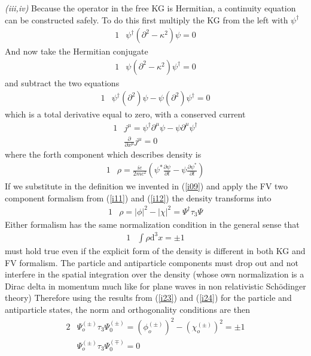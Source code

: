 \documentclass[]{article}
\numberwithin{equation}{subsection}
\begin{document}
\noindent\emph{(iii,iv)} Because the operator in the free KG is Hermitian, a continuity equation can be constructed safely. To do this first multiply the KG from the left with $\psi^{\dagger}$
\begin{alignat}{1}
  \label{ii01} &\psi^{\dagger}(\partial^{2}-\kappa^{2})\psi=0
\end{alignat}
And now take the Hermitian conjugate
\begin{alignat}{1}
  \label{ii02} &\psi(\partial^{2}-\kappa^{2})\psi^{\dagger}=0
\end{alignat}
and subtract the two equations
\begin{alignat}{1}
  \label{ii03} &\psi^{\dagger}(\partial^{2})\psi-\psi(\partial^{2})\psi^{\dagger}=0
\end{alignat}
which is a total derivative equal to zero, with a conserved current
\begin{alignat}{1}
  \label{ii04} &j^{\mu}=\psi^{\dagger}\partial^{\mu}\psi-\psi\partial^{\mu}\psi^{\dagger}\\
  \label{i25} &\frac{\partial}{\partial x^{\mu}}j^{\mu}=0
\end{alignat}
where the forth component which describes density is
\begin{alignat}{1}
  \label{i26} &\rho=\frac{ie}{2mc^{2}}(\psi^{*}\frac{\partial\psi}{\partial t}-\psi\frac{\partial\psi^{*}}{\partial t})
\end{alignat}
If we substitute in the definition we invented in (\ref{i09}) and apply the FV two component formalism from (\ref{i11}) and (\ref{i12}) the density transforms into
\begin{alignat}{1}
  \label{i27} &\rho=|\phi|^{2}-|\chi|^{2}=\Psi^{\dagger}\tau_{3}\Psi
\end{alignat}
Either formalism has the same normalization condition in the general sense that
\begin{alignat}{1}
  \label{i28} &\int\rho\mathrm{d}^{3}x=\pm 1
\end{alignat}
must hold true even if the explicit form of the density is different in both KG and FV formalism. The particle and antiparticle components must drop out and not interfere in the spatial integration over the density (whose own normalization is a Dirac delta in momentum much like for plane waves in non relativistic Sch{\"o}dinger theory) Therefore using the results from (\ref{i23}) and (\ref{i24}) for the particle and antiparticle states, the norm and orthogonality conditions  are then
\begin{alignat}{2}
  \label{i29} &\Psi_{o}^{(\pm)}\tau_{3}\Psi_{0}^{(\pm)}=(\phi_{o}^{(\pm)})^{2}-(\chi_{o}^{(\pm)})^{2}=\pm 1\\
  \label{i30} &\Psi_{o}^{(\pm)}\tau_{3}\Psi_{0}^{(\mp)}=0
\end{alignat}
\end{document}
